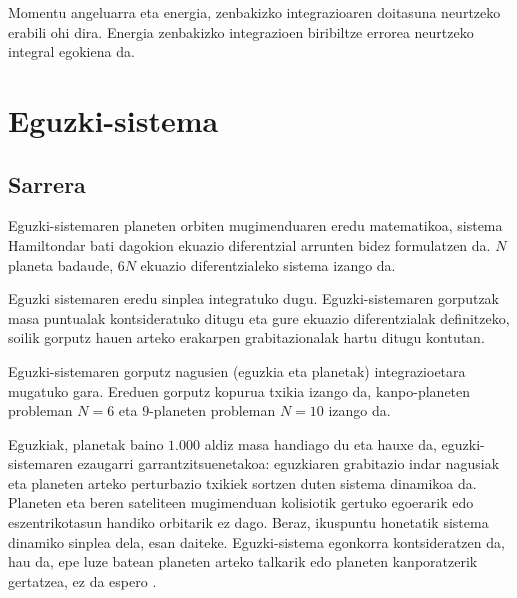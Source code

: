 Momentu angeluarra eta energia, zenbakizko integrazioaren doitasuna neurtzeko erabili ohi dira. Energia zenbakizko integrazioen biribiltze errorea neurtzeko integral egokiena da.

\section{Eguzki-sistema}
\label{ss:34}

\subsection{Sarrera}

Eguzki-sistemaren planeten orbiten mugimenduaren eredu matematikoa, sistema Hamiltondar bati dagokion ekuazio diferentzial arrunten bidez formulatzen da. $N$ planeta badaude, $6N$ ekuazio diferentzialeko sistema izango da.

Eguzki sistemaren eredu sinplea integratuko dugu. Eguzki-sistemaren gorputzak masa puntualak kontsideratuko ditugu eta gure ekuazio diferentzialak definitzeko, soilik gorputz hauen arteko erakarpen grabitazionalak hartu ditugu kontutan.

Eguzki-sistemaren gorputz nagusien (eguzkia eta planetak) integrazioetara mugatuko gara. Ereduen gorputz kopurua txikia izango da, kanpo-planeten probleman $N=6$ eta $9$-planeten probleman $N=10$ izango da.

Eguzkiak, planetak baino $1.000$ aldiz masa handiago du eta hauxe da, eguzki-sistemaren ezaugarri garrantzitsuenetakoa: eguzkiaren grabitazio indar nagusiak eta planeten arteko perturbazio txikiek sortzen duten sistema dinamikoa da. Planeten eta beren sateliteen mugimenduan kolisiotik gertuko egoerarik edo eszentrikotasun handiko orbitarik ez dago. Beraz, ikuspuntu honetatik sistema dinamiko sinplea dela, esan daiteke. Eguzki-sistema egonkorra kontsideratzen da, hau da, epe luze batean planeten arteko talkarik edo planeten kanporatzerik gertatzea, ez da espero  \cite{Laskar1999,Hayes2007}.

